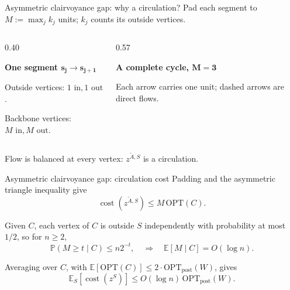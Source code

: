\documentclass[aspectratio=169,12pt]{beamer}
\newcommand{\OPT}{\mathrm{OPT}}
\newcommand{\optpost}{\OPT_{\mathrm{post}}}
\newcommand{\E}{\mathbb{E}}
\newcommand{\Pp}{\mathbb{P}}
\newcommand{\cost}{\operatorname{cost}}
\begin{document}
\begin{frame}{Asymmetric clairvoyance gap: why a circulation?}
  \small
  Pad each segment to \(M:=\max_j k_j\) units;
  \(k_j\) counts its outside vertices.

  \smallskip
  \begin{columns}[c,onlytextwidth]
    \begin{column}{0.40\textwidth}
      \centering
      {\footnotesize\bfseries One segment \(\boldsymbol{\mathbf{s_j\to s_{j+1}}}\)\par}
      \smallskip
      \resizebox{0.96\linewidth}{!}{\ThSegmentPadding}\par
      \smallskip
      {\footnotesize
        Outside vertices: \(1\text{ in},1\text{ out}\).\par
        Backbone vertices: \(M\text{ in},M\text{ out}\).\par}
    \end{column}
    \begin{column}{0.57\textwidth}
      \centering
      {\footnotesize\bfseries A complete cycle, \(\boldsymbol{\mathbf{M=3}}\)\par}
      \smallskip
      \resizebox{0.92\linewidth}{!}{\ThPaddedCirculationCycle}\par
      {\scriptsize Each arrow carries one unit;
        \textcolor{ThGold}{dashed arrows} are direct flows.\par}
    \end{column}
  \end{columns}

  \smallskip
  \centering
  Flow is balanced at every vertex: \(z^{\widetilde A,S}\) is a circulation.
\end{frame}

\begin{frame}{Asymmetric clairvoyance gap: circulation cost}
  \normalsize
  Padding and the asymmetric triangle inequality give
  \[
    \cost(z^{\widetilde A,S})\le M\,\OPT(C).
  \]

  \smallskip
  Given \(C\), each vertex of \(C\) is outside \(S\) independently with
  probability at most \(1/2\), so for \(n\ge2\),
  \[
    \Pp(M\ge t\mid C)\le n2^{-t},
    \quad\Longrightarrow\quad
    \E[M\mid C]=O(\log n).
  \]

  \smallskip
  Averaging over \(C\), with \(\E[\OPT(C)]\le2\cdot\optpost(W)\), gives
  \[
    \E_S[\cost(z^S)]\le O(\log n)\,\optpost(W).
  \]
\end{frame}
\end{document}
